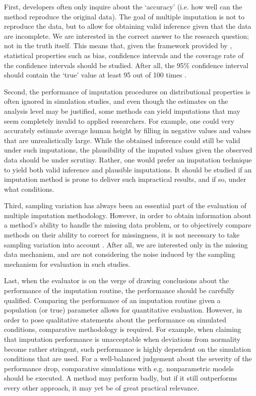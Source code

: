 \documentclass[12pt, a4paper]{article}
\begin{document}
First, developers often only inquire about the `accuracy' (i.e. how well can the method reproduce the original data). The goal of multiple imputation is not to reproduce the data, but to allow for obtaining valid inference given that the data are incomplete. We are interested in the correct answer to the research question; not in the truth itself. This means that, given the framework provided by \citep{rubin1987}, statistical properties such as bias, confidence intervals and the coverage rate of the confidence intervals should be studied. After all, the 95\% confidence interval should contain the `true' value at least 95 out of 100 times \citep[][p. 591]{neyman1934two}.

Second, the performance of imputation procedures on distributional properties is often ignored in simulation studies, and even though the estimates on the analysis level may be justified, some methods can yield imputations that may seem completely invalid to applied researchers. For example, one could very accurately estimate average human height by filling in negative values and values that are unrealistically large. While the obtained inference could still be valid under such imputations, the plausibility of the imputed values given the observed data should be under scrutiny. Rather, one would prefer an imputation technique to yield both valid inference and plausible imputations. It should be studied if an imputation method is prone to deliver such impractical results, and if so, under what conditions.

Third, sampling variation has always been an essential part of the evaluation of multiple imputation methodology. However, in order to obtain information about a method's ability to handle the missing data problem, or to objectively compare methods on their ability to correct for missingness, it is not necessary to take sampling variation into account \citep{vink2014pooling}. After all, we are interested only in the missing data mechanism, and are not considering the noise induced by the sampling mechanism for evaluation in such studies.

Last, when the evaluator is on the verge of drawing conclusions about the performance of the imputation routine, the performance should be carefully qualified. Comparing the performance of an imputation routine given a population (or true) parameter allows for quantitative evaluation. However, in order to pose qualitative statements about the performance on simulated conditions, comparative methodology is required. For example, when claiming that imputation performance is unacceptable when deviations from normality become rather stringent, such performance is highly dependent on the simulation conditions that are used. For a well-balanced judgement about the severity of the performance drop, comparative simulations with e.g. nonparametric models should be executed. A method may perform badly, but if it still outperforms every other approach, it may yet be of great practical relevance.
\end{document}
